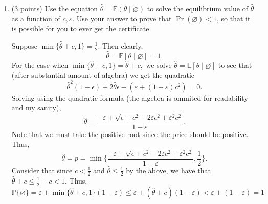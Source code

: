 \documentclass[11pt]{article}
\newcommand{\bbE}{\mathbb{E}}
\newcommand{\bbP}{\mathbb{P}}
\begin{document}
\begin{enumerate}[label=2.\arabic*.]
\begin{solution}
\begin{align*}
    &= \bbE[\theta] \frac{\bbP\{\text{PSET}, \varnothing\}}{\bbP\{\varnothing\}} +\bbE[(\theta \mid \text{No PSET}]\frac{\bbP\{\text{No PSET}, \varnothing\}}{\bbP\{\varnothing\}}\\
    &= \frac{1}{2}\frac{\bbP\{\varnothing \mid \text{PSET}\}\bbP\{\text{PSET}\}}{\bbP\{\varnothing\}} + \frac{\min\{\hat{\theta} + c, 1\}}{2}\frac{\bbP\{\varnothing \mid \text{No PSET}\}\bbP\{\text{No PSET}\}}{\bbP\{\varnothing\}}\\
    &= \frac{1}{2}\frac{\varepsilon}{\varepsilon + \min\{(\hat{\theta} + c), 1\})(1-\varepsilon)} + \frac{\min\{\hat{\theta} + c, 1\}}{2} \frac{\bbP\{\theta < \hat{\theta} + c\}(1-\varepsilon)}{\varepsilon + (\min\{(\hat{\theta} + c), 1\})(1-\varepsilon)}\\
    &= \boxed{\frac{1}{2}\frac{\epsilon + \min\{\hat{\theta} + c, 1\}^2 (1-\varepsilon)}{\varepsilon + \min\{(\hat{\theta} + c), 1\}(1-\varepsilon)}}
\end{align*}
\end{solution}

    \item (3 points) Use the equation $\hat{\theta} = \mathbb{E}(\theta \mid \varnothing)$ to solve the equilibrium value of $\hat{\theta}$ as a function of $c, \varepsilon$. Use your answer to prove that $\Pr(\varnothing) < 1$, so that it is possible for you to ever get the certificate.
\begin{solution}
Suppose $\min\{\hat{\theta} + c , 1\} = \frac{1}{2}.$ Then clearly, 
\[\hat{\theta}= \bbE[\theta \mid \varnothing] = 1.\] For the case when $\min\{\hat{\theta} + c , 1\} = \hat{\theta} + c,$ we solve $\hat{\theta} = \bbE[\theta \mid \varnothing]$ to see that (after substantial amount of algebra) we get the quadratic
\[\hat{\theta}^2(1-\epsilon) + 2\hat{\theta}\epsilon - (\varepsilon  + (1- \varepsilon)c^2) = 0.\] Solving using the quadratic formula (the algebra is ommited for readability and my sanity),
\[\hat{\theta} = \frac{-\varepsilon \pm \sqrt{\epsilon + c^2 -2\varepsilon c^2 + \varepsilon^2 c^2}}{1-\varepsilon}.\] Note that we must take the positive root since the price should be positive. Thus,
\[\boxed{\hat{\theta} = p = \min\{\frac{-\varepsilon \pm \sqrt{\epsilon + c^2 -2\varepsilon c^2 + \varepsilon^2 c^2}}{1-\varepsilon}, \frac{1}{2}\}}.\] Consider that since $c < \frac{1}{2}$ and $\hat{\theta} \leq \frac{1}{2}$ by the above, we have that $\hat{\theta} + c \leq \frac{1}{2} + c < 1.$ Thus, 
\[\bbP\{\varnothing\} = \varepsilon+ \min\{\hat{\theta} + c, 1\}(1-\varepsilon) \leq \varepsilon + (\hat{\theta} + c)(1-\varepsilon) < \varepsilon + (1-\varepsilon) = 1\]
\end{solution}


\end{enumerate}
\end{document}

